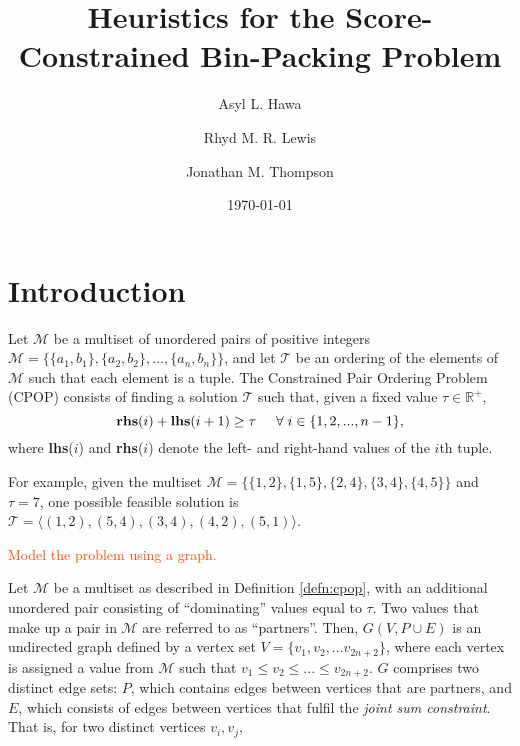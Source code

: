 \documentclass[oribibl]{llncs}
\title{Heuristics for the Score-Constrained Bin-Packing Problem}
\author{Asyl L. Hawa \and Rhyd M. R. Lewis \and Jonathan M. Thompson}
\institute{School of Mathematics, Cardiff University, Senghennydd Road, Cardiff, UK, CF24 4AG}
\date{\today}
\begin{document}
\maketitle

\begin{abstract}
	
\end{abstract}

\section{Introduction}
\label{sec:intro}

\begin{definition}
	\label{defn:cpop}
	Let $\mathcal{M}$ be a multiset of unordered pairs of positive integers $\mathcal{M} = \{\{a_1, b_1\}, \{a_2,b_2\},...,\{a_n,b_n\}\}$, and let $\mathcal{T}$ be an ordering of the elements of $\mathcal{M}$ such that each element is a tuple. The Constrained Pair Ordering Problem (CPOP) consists of finding a solution $\mathcal{T}$ such that, given a fixed value $\tau \in \mathbb{R}^{+},$
	\begin{equation}
		\label{eqn:cpop}
		\textup{\textbf{rhs}}(i) + \textup{\textbf{lhs}}(i+1) \geq \tau \hspace{5mm} \forall \hspace{1mm} i \in \{1,2,..., n-1\},
	\end{equation}
	where \textup{\textbf{lhs}($i$)} and \textup{\textbf{rhs}($i$)} denote the left- and right-hand values of the $i$th tuple.	
\end{definition}

For example, given the multiset $\mathcal{M} = \{\{1,2\}, \{1,5\}, \{2,4\}, \{3,4\}, \{4,5\}\}$ and $\tau = 7$, one possible feasible solution is $\mathcal{T} = \langle(1,2), (5,4), (3,4), (4,2), (5,1) \rangle$.

\textcolor{OrangeRed}{Model the problem using a graph.}

Let $\mathcal{M}$ be a multiset as described in Definition \ref{defn:cpop}, with an additional unordered pair consisting of ``dominating'' values equal to $\tau$. Two values that make up a pair in $\mathcal{M}$ are referred to as ``partners''. Then, $G(V, P \cup E)$ is an undirected graph defined by a vertex set $V = \{v_1, v_2, ...v_{2n+2}\}$, where each vertex is assigned a value from $\mathcal{M}$ such that $v_1 \leq v_2 \leq ... \leq v_{2n+2}$. $G$ comprises two distinct edge sets: $P$, which contains edges between vertices that are partners, and $E$, which consists of edges between vertices that fulfil the \textit{joint sum constraint}. That is, for two distinct vertices $v_i, v_j$,
\end{document}
